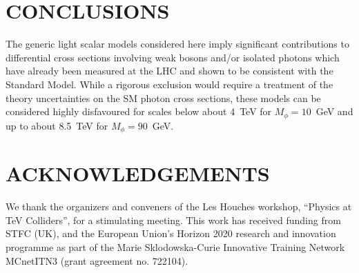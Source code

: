 \documentclass[11pt]{cernrep}
\begin{document}


\section*{CONCLUSIONS}
The generic light scalar models considered here imply significant contributions to differential cross sections involving 
weak bosons and/or isolated photons which have already been measured at the LHC and shown to be consistent with the Standard Model. 
While a rigorous exclusion would require a treatment of the theory uncertainties on the SM photon cross sections, these models
can be considered highly disfavoured for scales below about 4~TeV for $M_\phi = 10$~GeV and up to about 8.5~TeV for 
$M_\phi = 90$~GeV.


\section*{ACKNOWLEDGEMENTS}
We thank the organizers and conveners of the Les Houches workshop, ``Physics
at TeV Colliders'', for a stimulating meeting.
This work has received funding from STFC (UK), and the European Union's Horizon 2020 research and innovation programme 
as part of the Marie Sklodowska-Curie Innovative Training Network MCnetITN3 (grant agreement no. 722104).


\end{document}
